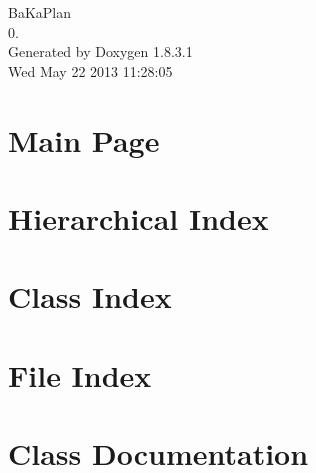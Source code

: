 \documentclass{book}
\begin{document}
\hypersetup{pageanchor=false,citecolor=blue}
\begin{titlepage}
\vspace*{7cm}
\begin{center}
{\Large Ba\-Ka\-Plan \\[1ex]\large 0. }\\
\vspace*{1cm}
{\large Generated by Doxygen 1.8.3.1}\\
\vspace*{0.5cm}
{\small Wed May 22 2013 11:28:05}\\
\end{center}
\end{titlepage}
\clearemptydoublepage
{}
\tableofcontents
\clearemptydoublepage
{}
\hypersetup{pageanchor=true,citecolor=blue}
\chapter{Main Page}
\label{index}\hypertarget{index}{}
\chapter{Hierarchical Index}

\chapter{Class Index}

\chapter{File Index}

\chapter{Class Documentation}
























\end{document}
